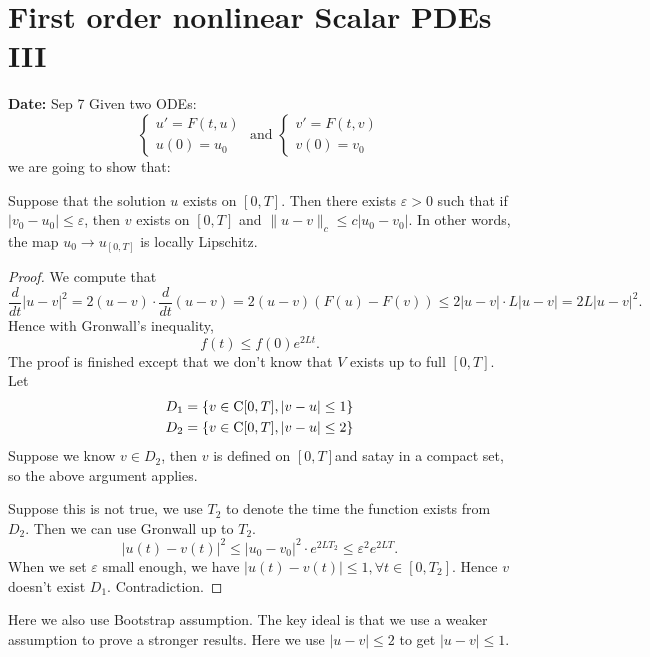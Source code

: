 \newpage 
\section{First order nonlinear Scalar PDEs III}
\textbf{Date:} Sep 7
Given two ODEs:
\[
  \begin{cases}
      u' = F(t, u)\\
      u(0) = u_0 
  \end{cases}  
  \text{ and } 
  \begin{cases}
      v' = F(t,v)\\
      v(0) = v_0
  \end{cases}
\]
we are going to show that: 

\begin{theorem}
    Suppose that the solution $u$ exists on $[0,T]$. Then there exists $\varepsilon>0$ such that if $|v_0-u_0|\le \varepsilon$, then $v$ exists on $[0,T]$ and $\|u-v\|_c \le c|u_0-v_0|$. In other words, the map $u_0 \to u_{[0,T]}$ is locally Lipschitz.
\end{theorem}

\begin{proof}
    We compute that 
    \[
        \frac{d}{dt}|u-v|^2 = 2(u-v) \cdot \frac{d}{dt}(u-v) = 2(u-v) (F(u) - F(v)) \le 2|u-v| \cdot L |u-v| = 2L|u-v|^2.
    \]  
    Hence with Gronwall's inequality, 
    \[
        f(t) \le f(0) e^{2Lt}.  
    \]
    The proof is finished except that we don't know that $V$ exists up to full $[0,T]$. Let 
    \begin{align*}
        D_1 = \{v\in \operatorname{C}[0,T], |v-u|\le 1\} \\
        D_2 = \{v\in \operatorname{C}[0,T], |v-u|\le 2\}      
    \end{align*}
    Suppose we know $v\in D_2$, then $v$ is defined on $[0,T]$and satay in a compact set, so the above argument applies.

    Suppose this is not true, we use $T_2$ to denote the time the function exists from $D_2$. Then we can use Gronwall up to $T_2$. 
    \[
    |u(t)-v(t)|^2 \le |u_0-v_0|^2 \cdot e^{2LT_2} \le \varepsilon^2 e^{2LT}.  
    \]
    When we set $\varepsilon$ small enough, we have $|u(t) -v(t)|\le 1 , \forall t\in [0,T_2]$. Hence $v$ doesn't exist $D_1$. Contradiction.
\end{proof}

\begin{remark}
    Here we also use Bootstrap assumption. The key ideal is that we use a weaker assumption to prove a stronger results. Here we use $|u-v|\le 2$ to get $|u-v|\le 1$. 
\end{remark}


